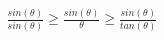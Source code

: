 \documentclass[preview]{standalone}
\begin{document}
\begin{align*}
\frac{sin(\theta)}{sin(\theta)} \geq \frac{sin(\theta)}{\theta} \geq \frac{sin(\theta)}{tan(\theta)}
\end{align*}
\end{document}
